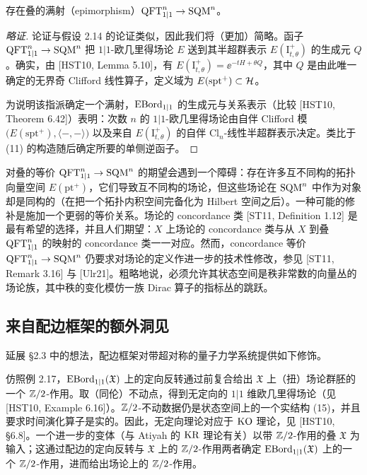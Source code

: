 \begin{hypothesis}
存在叠的满射（epimorphism）$\operatorname{QFT}^n_{1|1}\to\operatorname{SQM}^n$。
\end{hypothesis}
\begin{proof}[略证]
论证与假设 2.14 的论证类似，因此我们将（更加）简略。函子 $\operatorname{QFT}^n_{1|1}\to\operatorname{SQM}^n$ 把 $1|1$-欧几里得场论 $E$ 送到其半超群表示 $E(\mathrm{I}^+_{t,\theta})$ 的生成元 $Q$。确实，由 [HST10, Lemma 5.10]，有 $E(\mathrm{I}^+_{t,\theta})=\ee^{-tH+\theta Q}$，其中 $Q$ 是由此唯一确定的无界奇 Clifford 线性算子，定义域为 $E(\mathrm{spt}^+)\subset\mathcal{H}$。

为说明该指派确定一个满射，$\operatorname{EBord}_{1|1}$ 的生成元与关系表示（比较 [HST10, Theorem 6.42]）表明：次数 $n$ 的 $1|1$-欧几里得场论由自伴 Clifford 模 $\bigl(E(\mathrm{spt}^+),\langle-,-\rangle\bigr)$ 以及来自 $E(\mathrm{I}^+_{t,\theta})$ 的自伴 $\mathrm{Cl}_n$-线性半超群表示决定。类比于 (11) 的构造随后确定所要的单侧逆函子。
\end{proof}

\begin{remark}[3.21]
对叠的等价 $\operatorname{QFT}^n_{1|1}\to\operatorname{SQM}^n$ 的期望会遇到一个障碍：存在许多互不同构的拓扑向量空间 $E(\mathrm{pt}^+)$，它们导致互不同构的场论，但这些场论在 $\operatorname{SQM}^n$ 中作为对象却是同构的（在把一个拓扑内积空间完备化为 Hilbert 空间之后）。一种可能的修补是施加一个更弱的等价关系。场论的 concordance 类 [ST11, Definition 1.12] 是最有希望的选择，并且人们期望：$X$ 上场论的 concordance 类与从 $X$ 到叠 $\operatorname{QFT}^n_{1|1}$ 的映射的 concordance 类一一对应。然而，concordance 等价 $\operatorname{QFT}^n_{1|1}\to\operatorname{SQM}^n$ 仍要求对场论的定义作进一步的技术性修改，参见 [ST11, Remark 3.16] 与 [Ulr21]。粗略地说，必须允许其状态空间是秩非常数的向量丛的场论族，其中秩的变化模仿一族 Dirac 算子的指标丛的跳跃。
\end{remark}

\subsection{来自配边框架的额外洞见}
延展 §2.3 中的想法，配边框架对带超对称的量子力学系统提供如下修饰。

\begin{example}[3.22（定向反转、KO 与 KR）]
仿照例 2.17，$\operatorname{EBord}_{1|1}(\mathfrak X)$ 上的定向反转通过前复合给出 $\mathfrak X$ 上（扭）场论群胚的一个 $\mathbb{Z}/2$-作用。取（同伦）不动点，得到无定向的 $1|1$ 维欧几里得场论（见 [HST10, Example 6.16]）。$\mathbb{Z}/2$-不动数据仍是状态空间上的一个实结构 (15)，并且要求时间演化算子是实的。因此，无定向理论对应于 $\mathrm{KO}$ 理论，见 [HST10, §6.8]。一个进一步的变体（与 Atiyah 的 $\mathrm{KR}$ 理论有关）以带 $\mathbb{Z}/2$-作用的叠 $\mathfrak X$ 为输入；这通过配边的定向反转与 $\mathfrak X$ 上的 $\mathbb{Z}/2$-作用两者确定 $\operatorname{EBord}_{1|1}(\mathfrak X)$ 上的一个 $\mathbb{Z}/2$-作用，进而给出场论上的 $\mathbb{Z}/2$-作用。
\end{example}


